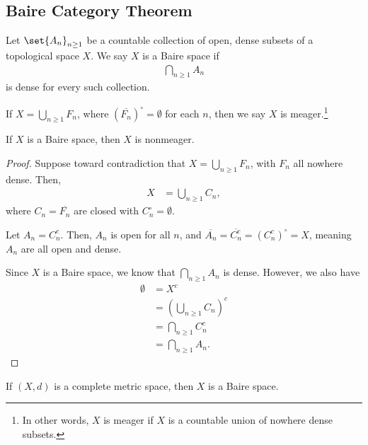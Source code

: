 \documentclass[10pt]{mypackage}
\begin{document}
\subsection{Baire Category Theorem}%
\begin{definition}
  Let $\set{A_n}_{n\geq 1}$ be a countable collection of open, dense subsets of a topological space $X$. We say $X$ is a Baire space if
  \begin{align*}
    \bigcap_{n\geq 1}A_n
  \end{align*}
  is dense for every such collection.
\end{definition}
\begin{definition}
  If $X = \bigcup_{n\geq 1}F_n$, where $\left(\overline{F_n}\right)^{\circ} = \emptyset$ for each $n$, then we say $X$ is meager.\footnote{In other words, $X$ is meager if $X$ is a countable union of nowhere dense subsets.}
\end{definition}
\begin{proposition}
  If $X$ is a Baire space, then $X$ is nonmeager.
\end{proposition}
\begin{proof}
  Suppose toward contradiction that $X = \bigcup_{n\geq 1}F_n$, with $F_n$ all nowhere dense. Then,
  \begin{align*}
    X &= \bigcup_{n\geq 1}C_n,
  \end{align*}
  where $C_n = \overline{F_n}$ are closed with $C_n^{\circ} = \emptyset$.\newline

  Let $A_n = C_n^{c}$. Then, $A_n$ is open for all $n$, and $\overline{A_n} = \overline{C_n^{c}} = \left(C_n^{c}\right)^{\circ} = X$, meaning $A_n$ are all open and dense.\newline

  Since $X$ is a Baire space, we know that $\bigcap_{n\geq 1}A_n $ is dense. However, we also have
  \begin{align*}
    \emptyset &= X^{c}\\
              &= \left(\bigcup_{n\geq 1}C_n\right)^{c}\\
              &= \bigcap_{n\geq 1}C_n^{c}\\
              &= \bigcap_{n\geq 1}A_n.
  \end{align*}
\end{proof}
\begin{theorem}
  If $(X,d)$ is a complete metric space, then $X$ is a Baire space.
\end{theorem}
\end{document}
